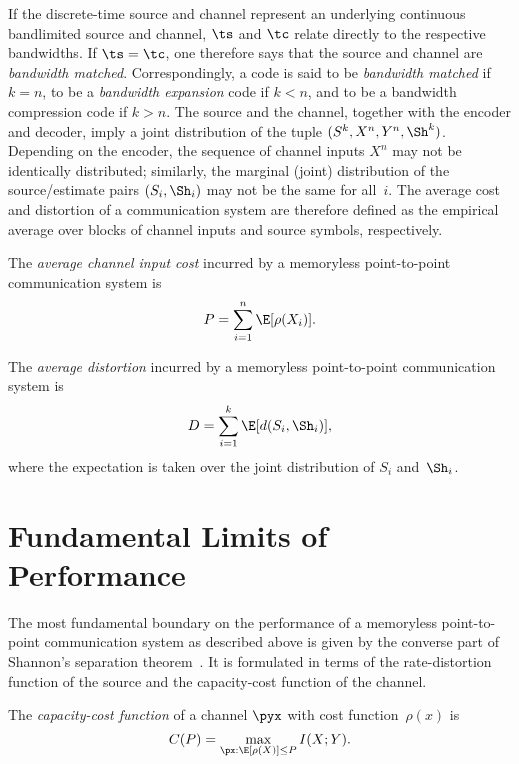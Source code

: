 If the discrete-time source and channel represent an underlying continuous
bandlimited source and channel, $\ts$ and $\tc$ relate directly to
the respective bandwidths. If $\ts = \tc$, one therefore says that the source
and channel are \emph{bandwidth matched}. Correspondingly, a code is said to be
\emph{bandwidth matched} if $k=n$, to be a \emph{bandwidth expansion} code if $k
< n$, and to be a bandwidth compression code if $k > n$. 
The source and the channel, together with the encoder and decoder, imply a joint
distribution of the tuple $(S^k, X^n, Y^n, \Sh^k)$.  Depending on the encoder,
the sequence of channel inputs $X^n$ may not be identically distributed;
similarly, the marginal (joint) distribution of the source/estimate pairs
$(S_i,\Sh_i)$ may not be the same for all~$i$. The average cost and distortion
of a communication system are therefore defined as the empirical average over
blocks of channel inputs and source symbols, respectively.

\begin{definition}
  \label{def:avgcost}
  The \emph{average channel input cost} incurred by a memoryless point-to-point
  communication system is
  \begin{equation*}
    P = \sum_{i=1}^n \E[\rho(X_i)].
  \end{equation*}
\end{definition}

\begin{definition}
  \label{def:avgdist}
  The \emph{average distortion} incurred by a memoryless point-to-point
  communication system is
  \begin{equation*}
    D = \sum_{i=1}^k \E[d(S_i, \Sh_i)],
  \end{equation*}
  where the expectation is taken over the joint distribution of $S_i$
  and~$\Sh_i$.
\end{definition}


\section{Fundamental Limits of Performance}

The most fundamental boundary on the performance of a memoryless point-to-point
communication system as described above is given by the converse part of
Shannon's separation theorem~\cite{Gallager1968}. It is formulated in terms of
the rate-distortion function of the source and the capacity-cost function of the
channel. 

\begin{definition}
  \label{def:capacity}
  The \emph{capacity-cost function} of a channel $\pyx$ with cost
  function~$\rho(x)$ is
  \begin{equation*}
    C(P) = \max_{\px: \E[\rho(X)] \le P} I(X;Y).
  \end{equation*}
\end{definition}

